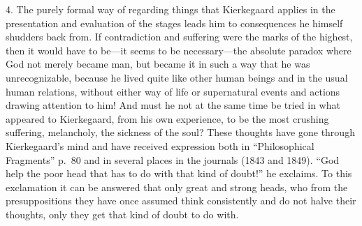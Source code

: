 \documentclass[12pt,a4paper]{book}
\newcommand{\opage}[1]{\marginnote{\footnotesize\textit{[#1]}}}
\begin{document}
4. The purely formal way of regarding things that Kierkegaard applies in
the presentation and evaluation of the stages leads him to consequences
he himself shudders back from. If contradiction and suffering were the
marks of the highest, then it would have to be---it seems to be
necessary---the absolute paradox where God not merely became man, but
became it in such a way that he was unrecognizable, because he lived
quite like other human beings and in the usual human relations, without
either way of life or supernatural events and actions drawing attention
to him! And must he not at the same time be tried in what appeared to
Kierkegaard, from his own experience, to be the most crushing suffering,
melancholy, the sickness of the soul? These thoughts have gone through
Kierkegaard's mind and have received
\opage{125}expression both in ``Philosophical Fragments'' p.~80 and in
several places in the journals (1843 and 1849). ``God help the poor
head that has to do with that kind of doubt!'' he exclaims. To this
exclamation it can be answered that only great and strong heads, who
from the presuppositions they have once assumed think consistently and
do not halve their thoughts, only they get that kind of doubt to do
with.
\end{document}
